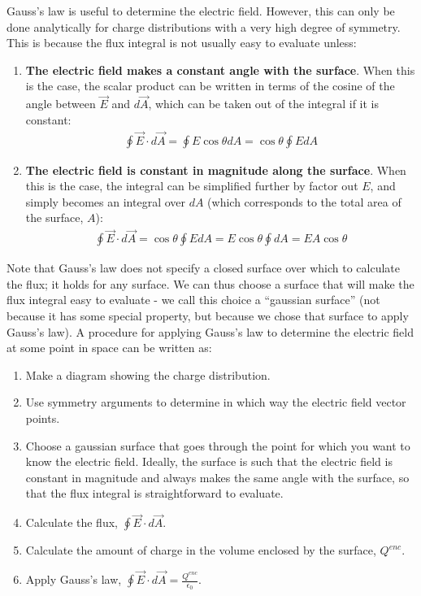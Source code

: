 \begin{chapterSummary}
Gauss's law is useful to determine the electric field. However, this can only be done analytically for charge distributions with a very high degree of symmetry. This is because the flux integral is not usually easy to evaluate unless:
\begin{enumerate}
\item \textbf{The electric field makes a constant angle with the surface}. When this is the case, the scalar product can be written in terms of the cosine of the angle between $\vec E$ and $d\vec A$, which can be taken out of the integral if it is constant:
\begin{align*}
\oint \vec E\cdot d\vec A=\oint E\cos\theta dA=\cos\theta\oint EdA
\end{align*}
\item \textbf{The electric field is constant in magnitude along the surface}. When this is the case, the integral can be simplified further by factor out $E$, and simply becomes an integral over $dA$ (which corresponds to the total area of the surface, $A$):
\begin{align*}
\oint \vec E\cdot d\vec A=\cos\theta\oint EdA =E\cos\theta\oint dA=EA\cos\theta 
\end{align*}
\end{enumerate}
Note that Gauss's law does not specify a closed surface over which to calculate the flux; it holds for any surface. We can thus choose a surface that will make the flux integral easy to evaluate - we call this choice a ``gaussian surface'' (not because it has some special property, but because we chose that surface to apply Gauss's law). A procedure for applying Gauss's law to determine the electric field at some point in space can be written as:
\begin{enumerate}
\item Make a diagram showing the charge distribution.
\item Use symmetry arguments to determine in which way the electric field vector points.
\item Choose a gaussian surface that goes through the point for which you want to know the electric field. Ideally, the surface is such that the electric field is constant in magnitude and always makes the same angle with the surface, so that the flux integral is straightforward to evaluate.
\item Calculate the flux, $\oint \vec E\cdot d\vec A$.
\item Calculate the amount of charge in the volume enclosed by the surface, $Q^{enc}$.
\item Apply Gauss's law, $\oint \vec E\cdot d\vec A=\frac{Q^{enc}}{\epsilon_0} $.

\end{enumerate}
\end{chapterSummary}
